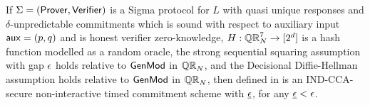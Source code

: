%
%



\begin{theorem}
\label{thm:NITC-mul-ROM}
If $\Sigma = (\mathsf{Prover}, \mathsf{Verifier})$ is a Sigma protocol for $L$ with quasi unique responses and $\delta$-unpredictable commitments which is sound with respect to auxiliary input $\mathsf{aux}=(p,q)$ and is honest verifier zero-knowledge, $H: \mathbb{QR}_N^7 \rightarrow [2^d]$ is a hash function modelled as a random oracle,  the strong sequential squaring assumption with gap $\epsilon$ holds relative to $\mathsf{GenMod}$ in $\mathbb{QR}_N$, and the Decisional Diffie-Hellman assumption holds relative to $\mathsf{GenMod}$ in $\mathbb{QR}_N$, then \mathlist{(\pgen, \com, \cvrfy, \dvrfy, \fdecom)} defined in  is an IND-CCA-secure non-interactive timed commitment scheme with $\underline{\epsilon}$, for any $\underline{\epsilon} < \epsilon$. 
\end{theorem}



